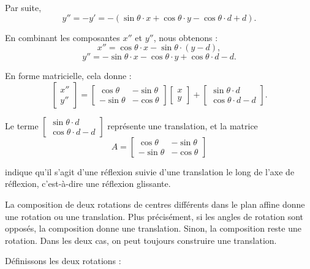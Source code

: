 Par suite,
\[ y'' = - y' = - (\sin \theta \cdot x + \cos \theta \cdot y - \cos \theta
   \cdot d + d) . \]


En combinant les composantes $x''$ et $y''$, nous obtenons :
\[ x'' = \cos \theta \cdot x - \sin \theta \cdot (y - d), \]
\[ y'' = - \sin \theta \cdot x - \cos \theta \cdot y + \cos \theta \cdot d -
   d. \]


En forme matricielle, cela donne :
\[ \left[ \begin{array}{c}
     x''\\
     y''
   \end{array} \right] = \left[ \begin{array}{cc}
     \cos \theta & - \sin \theta\\
     - \sin \theta & - \cos \theta
   \end{array} \right] \left[ \begin{array}{c}
     x\\
     y
   \end{array} \right] + \left[ \begin{array}{c}
     \sin \theta \cdot d\\
     \cos \theta \cdot d - d
   \end{array} \right] . \]


Le terme $\left[ \begin{array}{c}
  \sin \theta \cdot d\\
  \cos \theta \cdot d - d
\end{array} \right]$ repr{\'e}sente une translation, et la matrice
\[ A = \left[ \begin{array}{cc}
     \cos \theta & - \sin \theta\\
     - \sin \theta & - \cos \theta
   \end{array} \right] \]


indique qu'il s'agit d'une r{\'e}flexion suivie d'une translation le long de
l'axe de r{\'e}flexion, c'est-{\`a}-dire une r{\'e}flexion glissante.


La composition de deux rotations de centres diff{\'e}rents dans le plan affine
donne une rotation ou une translation. Plus pr{\'e}cis{\'e}ment, si les angles
de rotation sont oppos{\'e}s, la composition donne une translation. Sinon, la
composition reste une rotation. Dans les deux cas, on peut toujours construire
une translation.


D{\'e}finissons les deux rotations :

